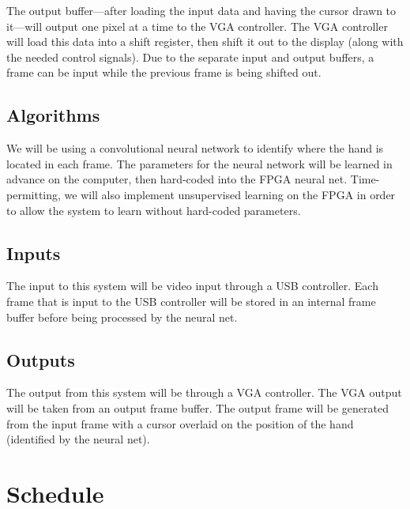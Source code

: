 \documentclass[10pt]{article}
\begin{document}
The output buffer---after loading the input data and having the cursor drawn to
it---will output one pixel at a time to the VGA controller. The VGA controller
will load this data into a shift register, then shift it out to the display
(along with the needed control signals). Due to the separate input and output
buffers, a frame can be input while the previous frame is being shifted out.

\subsection{Algorithms}
\label{sub:algorithms}

We will be using a convolutional neural network to identify where the hand is
located in each frame. The parameters for the neural network will be learned in
advance on the computer, then hard-coded into the FPGA neural net.
Time-permitting, we will also implement unsupervised learning on the FPGA in
order to allow the system to learn without hard-coded parameters.

\subsection{Inputs}
\label{sub:inputs}

The input to this system will be video input through a USB controller. Each
frame that is input to the USB controller will be stored in an internal frame
buffer before being processed by the neural net.

\subsection{Outputs}
\label{sub:outputs}

The output from this system will be through a VGA controller. The VGA output
will be taken from an output frame buffer. The output frame will be generated
from the input frame with a cursor overlaid on the position of the hand
(identified by the neural net).

\section{Schedule}
\label{sec:schedule}
\end{document}
